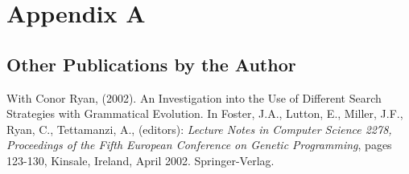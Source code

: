 \thispagestyle{plain}
\chapter{Appendix A}

\section*{Other Publications by the Author}

With Conor Ryan, (2002). An Investigation into the Use of Different Search Strategies with Grammatical Evolution. In Foster, J.A., Lutton, E., Miller, J.F., Ryan, C., Tettamanzi, A., (editors): \emph{Lecture Notes in Computer Science 2278, Proceedings of the Fifth European Conference on Genetic Programming}, pages 123-130, Kinsale, Ireland, April 2002. Springer-Verlag.
